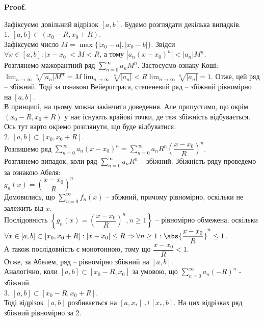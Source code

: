 \documentclass[a4paper, 10pt]{article}
\makeatletter
\def\huge{\displaystyle}
\def\qed{$\blacksquare$}
\theoremstyle{theoremdd}
\theoremstyle{theoremdd}
\theoremstyle{theoremdd}
\theoremstyle{theoremdd}
\theoremstyle{theoremdd}
\theoremstyle{theoremdd}
\theoremstyle{theoremdd}
\theoremstyle{theoremdd}
\theoremstyle{theoremdd}
\renewenvironment{proof}[1][Proof.\\]{\par
\pushQED{\hfill \qed}%
\normalfont \topsep6\p@\@plus6\p@\relax
\trivlist
\item\relax
{\bfseries
#1\@addpunct{.}}\hspace\labelsep\ignorespaces
}{%
\popQED\endtrivlist\@endpefalse
}
\makeatother
\begin{document}
\begin{proof}
Зафіксуємо довільний відрізок $[a,b]$. Будемо розглядати декілька випадків.\\
1. $[a,b] \subset (x_0-R,x_0+R)$.\\
Зафіксуємо число $M = \max\{|x_0-a|,|x_0-b|\}$. Звідси $\forall x \in [a,b]: |x-x_0| < M < R$, а тому $|a_n(x-x_0)^n| < |a_n| M^n$.\\
Розглянемо мажорантний ряд $\huge \sum_{n=0}^\infty a_n M^n$. Застосуємо ознаку Коші:\\
$\huge \lim_{n \to \infty} \sqrt[n]{|a_n| M^n} = M \lim_{n \to \infty} \sqrt[n]{|a_n|} < R \lim_{n \to \infty} \sqrt[n]{|a_n|} = 1$.
Отже, цей ряд -- збіжний. Тоді за ознакою Вейерштраса, степеневий ряд -- збіжний рівномірно на $[a,b]$.
\bigskip \\
В принципі, на цьому можна закінчити доведення. Але припустимо, що окрім $(x_0-R,x_0+R)$ у нає існують крайові точки, де теж збіжність відбувається. Ось тут варто окремо розглянути, що буде відбуватися.\\
2. $[a,b] \subset [x_0,x_0+R]$.\\
Розпишемо ряд $\huge \sum_{n=0}^\infty a_n(x-x_0)^n = \sum_{n=0}^\infty a_n R^n \left( \dfrac{x-x_0}{R} \right)^n$.\\
Розглянемо випадок, коли ряд $\huge \sum_{n=0}^\infty a_n R^n$ -- збіжний. Збіжність ряду проведемо за ознакою Абеля:\\
$g_n(x) = \left( \dfrac{x-x_0}{R} \right)^n$\\
Домовились, що $\huge \sum_{n=0}^\infty f_n(x)$ -- збіжний, причому рівномірно, оскільки не залежить від $x$.\\
Послідовність $\left\{ g_n(x) = \left( \dfrac{x-x_0}{R} \right)^n, n \geq 1 \right\}$ -- рівномірно обмежена, оскільки\\
$\forall x \in [a,b] \subset [x_0, x_0+R]: |x - x_0| \leq R \Rightarrow \forall n \geq 1: \abs{\dfrac{x-x_0}{R}}^n \leq 1$.\\
А також послідовність є монотонною, тому що $\dfrac{x-x_0}{R} < 1$.\\
Отже, за Абелем, ряд -- рівномірно збіжний на $[a,b]$.
\bigskip \\
Аналогічно, коли $[a,b] \subset [x_0-R, x_0]$ за умовою, що $\huge \sum_{n=0}^\infty a_n (-R)^n$ - збіжний.
\bigskip \\
3. $[a,b] \subset [x_0-R,x_0+R]$.\\
Тоді відрізок $[a,b]$ розбивається на $[a,x_*] \cup [x_*,b]$. На цих відрізках ряд збіжний рівномірно за 2.
\end{proof}
\end{document}
